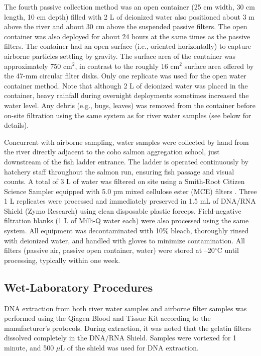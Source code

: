 \documentclass{article}
\begin{document}
The fourth passive collection method was an open container (25 cm width, 30 cm length, 10 cm depth) filled with 2 L of deionized water \cite{klepke2022} also positioned about 3 m above the river and about 30 cm above the suspended passive filters. The open container was also deployed for about 24 hours at the same times as the passive filters. The container had an open surface (i.e., oriented horizontally) to capture airborne particles settling by gravity. The surface area of the container was approximately 750 cm$^2$, in contrast to the roughly 16 cm$^2$ surface area offered by the 47-mm circular filter disks. Only one replicate was used for the open water container method. Note that although 2 L of deionized water was placed in the container, heavy rainfall during overnight deployments sometimes increased the water level. Any debris (e.g., bugs, leaves) was removed from the container before on-site filtration using the same system as for river water samples (see below for details).

Concurrent with airborne sampling, water samples were collected by hand from the river directly adjacent to the coho salmon aggregation school, just downstream of the fish ladder entrance. The ladder is operated continuously by hatchery staff throughout the salmon run, ensuring fish passage and visual counts. A total of 3 L of water was filtered on site using a Smith-Root Citizen Science Sampler equipped with 5.0 µm mixed cellulose ester (MCE) filters \cite{allan2023}. Three 1 L replicates were processed and immediately preserved in 1.5 mL of DNA/RNA Shield (Zymo Research) using clean disposable plastic forceps. Field-negative filtration blanks (1 L of Milli-Q water each) were also processed using the same system. All equipment was decontaminated with 10\% bleach, thoroughly rinsed with deionized water, and handled with gloves to minimize contamination. All filters (passive air, passive open container, water) were stored at –20$^\circ$C until processing, typically within one week.


\subsection{Wet-Laboratory Procedures}
DNA extraction from both river water samples and airborne filter samples was performed using the Qiagen Blood and Tissue Kit according to the manufacturer’s protocols. During extraction, it was noted that the gelatin filters dissolved completely in the DNA/RNA Shield. Samples were vortexed for 1 minute, and 500 $\mu$L of the shield was used for DNA extraction.
\end{document}
